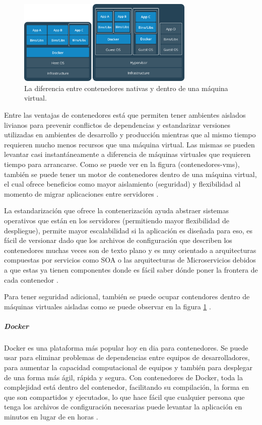 \begin{figure}
  \begin{center}
      \includegraphics[width=0.75\textwidth]{Figures/contenedores-vms.png}
  \end{center}
  \caption{La diferencia entre contenedores nativas y dentro de una máquina virtual. \citep{Docker-Containers}}
  \label{contenedores-vms}
\end{figure}

Entre las ventajas de contenedores está que permiten tener ambientes aislados livianos para prevenir conflictos de dependencias y estandarizar versiones utilizadas en ambientes de desarrollo y producción mientras que al mismo tiempo requieren mucho menos recursos que una máquina virtual. Las mismas se pueden levantar casi instantáneamente a diferencia de máquinas virtuales que requieren tiempo para arrancarse. Como se puede ver en la figura (contenedores-vms), también se puede tener un motor de contenedores dentro de una máquina virtual, el cual ofrece beneficios como mayor aislamiento (seguridad) y flexibilidad al momento de migrar aplicaciones entre servidores \citep{Docker-Containers}.

La estandarización que ofrece la contenerización ayuda abstraer sistemas operativos que están en los servidores (permitiendo mayor flexibilidad de despliegue),  permite mayor escalabilidad si la aplicación es diseñada para eso, es fácil de versionar dado que los archivos de configuración que describen los contenedores muchas veces son de texto plano y es muy orientado a arquitecturas compuestas por servicios como SOA o las arquitecturas de Microservicios debidos a que estas ya tienen componentes donde es fácil saber dónde poner la frontera de cada contenedor \citep{DigitalOcean-Docker-Ecosystem}.

Para tener seguridad adicional, también se puede ocupar contendores dentro de máquinas virtuales aisladas como se puede observar en la figura \ref{contenedores-vms} \citep{Docker-Containers}.

\subparagraph{Docker}
Docker es una plataforma más popular hoy en dia para contenedores. Se puede usar para eliminar problemas de dependencias entre equipos de desarrolladores, para aumentar la capacidad computacional de equipos y también para desplegar de una forma más ágil, rápida y segura. Con contenedores de Docker, toda la complejidad está dentro del contenedor, facilitando su compilación, la forma en que son compartidos y ejecutados, lo que hace fácil que cualquier persona que tenga los archivos de configuración necesarias puede levantar la aplicación en minutos en lugar de en horas \citep{Docker-What-Is}.

